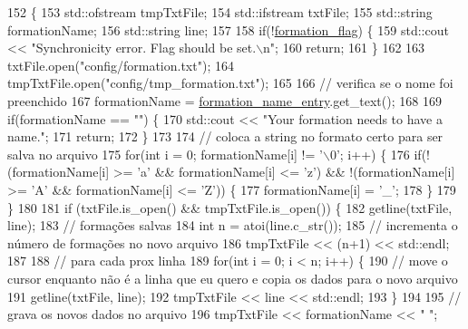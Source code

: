 \begin{DoxyCode}
152                                                   \{
153     std::ofstream tmpTxtFile;
154     std::ifstream txtFile;
155     std::string formationName;
156     std::string line;
157 
158     \textcolor{keywordflow}{if}(!\hyperlink{class_strategy_g_u_i_aaac145125516fb8b7fe7137db18cdb58}{formation\_flag}) \{
159         std::cout << \textcolor{stringliteral}{"Synchronicity error. Flag should be set.\(\backslash\)n"};
160         \textcolor{keywordflow}{return};
161     \}
162 
163     txtFile.open(\textcolor{stringliteral}{"config/formation.txt"});
164     tmpTxtFile.open(\textcolor{stringliteral}{"config/tmp\_formation.txt"});
165 
166     \textcolor{comment}{// verifica se o nome foi preenchido}
167     formationName = \hyperlink{class_strategy_g_u_i_a19406b76eaf73c06545aa1c67c0636ce}{formation\_name\_entry}.get\_text();
168 
169     \textcolor{keywordflow}{if}(formationName == \textcolor{stringliteral}{""}) \{
170         std::cout << \textcolor{stringliteral}{"Your formation needs to have a name."};
171         \textcolor{keywordflow}{return};
172     \}
173 
174     \textcolor{comment}{// coloca a string no formato certo para ser salva no arquivo}
175     \textcolor{keywordflow}{for}(\textcolor{keywordtype}{int} i = 0; formationName[i] != \textcolor{charliteral}{'\(\backslash\)0'}; i++) \{
176         \textcolor{keywordflow}{if}(!(formationName[i] >= \textcolor{charliteral}{'a'} && formationName[i] <= \textcolor{charliteral}{'z'}) && !(formationName[i] >= \textcolor{charliteral}{'A'} && 
      formationName[i] <= \textcolor{charliteral}{'Z'})) \{
177             formationName[i] = \textcolor{charliteral}{'\_'};
178         \}
179     \}
180 
181     \textcolor{keywordflow}{if} (txtFile.is\_open() && tmpTxtFile.is\_open()) \{
182         getline(txtFile, line);
183         \textcolor{comment}{// formações salvas}
184         \textcolor{keywordtype}{int} n = atoi(line.c\_str());
185         \textcolor{comment}{// incrementa o número de formações no novo arquivo}
186         tmpTxtFile << (n+1) << std::endl;
187 
188         \textcolor{comment}{// para cada prox linha}
189         \textcolor{keywordflow}{for}(\textcolor{keywordtype}{int} i = 0; i < n; i++) \{
190             \textcolor{comment}{// move o cursor enquanto não é a linha que eu quero e copia os dados para o novo arquivo}
191             getline(txtFile, line);
192             tmpTxtFile << line << std::endl;
193         \}
194 
195         \textcolor{comment}{// grava os novos dados no arquivo}
196         tmpTxtFile << formationName << \textcolor{stringliteral}{" "};

\end{DoxyCode}
